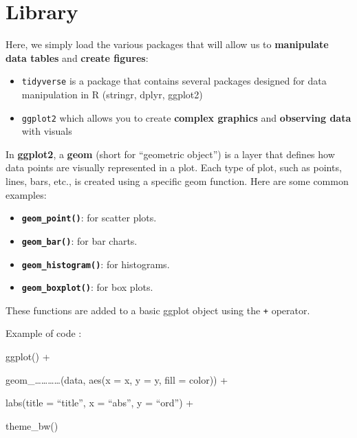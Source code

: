 \documentclass[
  letterpaper,
  DIV=11,
  numbers=noendperiod]{scrreprt}
\begin{document}
\section{Library}\label{library}

Here, we simply load the various packages that will allow us to
\textbf{manipulate data tables} and \textbf{create figures}:

\begin{itemize}
\item
  \texttt{tidyverse} is a package that contains several packages
  designed for data manipulation in R (stringr, dplyr, ggplot2)
\item
  \texttt{ggplot2} which allows you to create \textbf{complex graphics}
  and \textbf{observing data} with visuals
\end{itemize}

In \textbf{ggplot2}, a \textbf{geom} (short for ``geometric object'') is
a layer that defines how data points are visually represented in a plot.
Each type of plot, such as points, lines, bars, etc., is created using a
specific geom function. Here are some common examples:

\begin{itemize}
\item
  \textbf{\texttt{geom\_point()}}: for scatter plots.
\item
  \textbf{\texttt{geom\_bar()}}: for bar charts.
\item
  \textbf{\texttt{geom\_histogram()}}: for histograms.
\item
  \textbf{\texttt{geom\_boxplot()}}: for box plots.
\end{itemize}

These functions are added to a basic ggplot object using the \texttt{+}
operator.

Example of code :

ggplot() +

geom\_\ldots\ldots\ldots\ldots(data, aes(x = x, y = y, fill = color)) +

labs(title = ``title'', x = ``abs'', y = ``ord'') +

theme\_bw()
\end{document}
